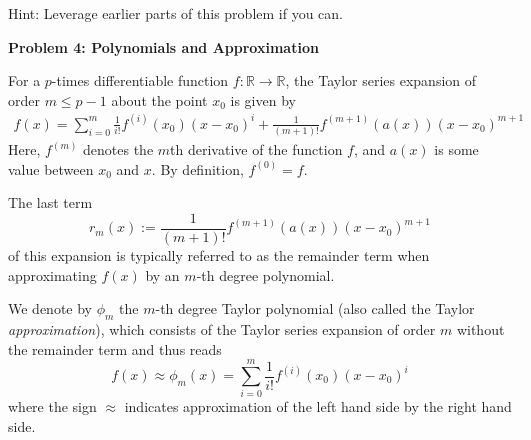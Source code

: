 \documentclass{article}\usepackage[utf8]{inputenc}\usepackage[margin=0.4cm,top=0.4cm,bottom=0.4cm]{geometry}\usepackage[usenames,dvipsnames,svgnames,table]{xcolor}
\begin{document}
\begin{enumerate}
Hint: Leverage earlier parts of this problem if you can.
\BeginSolution

\EndSolution
\end{enumerate}
\clearpage

\vspace{-2mm}\noindent\begin{mybox}{\begin{center}\textbf{\color{black}Problem 4: Polynomials and Approximation}\end{center}}\end{mybox}\vspace{-2mm}
\vspace{10pt}
\noindent For a $p$-times differentiable function $f: \mathbb{R} \to \mathbb{R}$, the Taylor series expansion of order $m \leqslant p - 1$ about the point $x_0$ is given by \begin{align*}f(x) = \sum_{i=0}^m\frac{1}{i!}f^{(i)}(x_0)(x-x_0)^i+\frac{1}{(m+1)!}f^{(m+1)}(a(x))(x-x_0)^{m+1}\tag{3}\end{align*} Here, $f^{(m)}$ denotes the $m$th derivative of the function $f$, and $a(x)$ is some value between $x_0$ and $x$. By definition, $f^{(0)} = f$.
\vspace{4pt}

\noindent The last term $$r_m(x) :=  \frac{1}{(m + 1)!} f^{(m+1)}(a(x)) (x - x_0)^{m + 1}$$ of this expansion is typically referred to as the remainder term when approximating $f(x)$ by an $m$-th degree polynomial.
\vspace{4pt}

\noindent We denote by $\phi_m$ the $m$-th degree Taylor polynomial (also called the Taylor \textit{approximation}), which consists of the Taylor series expansion of order $m$ without the remainder term and thus reads $$f(x)\approx \phi_m(x) = \sum_{i=0}^m\frac{1}{i!}f^{(i)}(x_0)(x-x_0)^i$$ where the sign $\approx$ indicates approximation of the left hand side by the right hand side.
\vspace{4pt}
\end{document}
